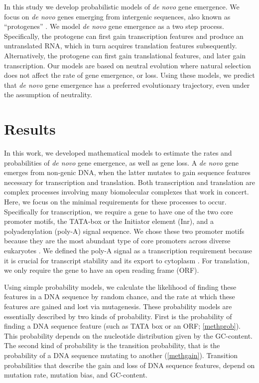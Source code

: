 \documentclass[12pt,a4paper]{article}
\begin{document}
In this study we develop probabilistic models of \textit{de novo} gene emergence. We focus on \textit{de novo} genes emerging from intergenic sequences, also known as ``protogenes'' \citep{protogenes}. We model \textit{de novo} gene emergence as a two step process. Specifically, the protogene can first gain transcription features and produce an untranslated RNA, which in turn acquires translation features subsequently. Alternatively, the protogene can first gain translational features, and later gain transcription. Our models are based on neutral evolution where natural selection does not affect the rate of gene emergence, or loss. Using these models, we predict that \textit{de novo} gene emergence has a preferred evolutionary trajectory, even under the assumption of neutrality.

\section{Results}

In this work, we developed mathematical models to estimate the rates and probabilities of \textit{de novo} gene emergence, as well as gene loss. A \textit{de novo} gene emerges from non-genic DNA, when the latter mutates to gain sequence features necessary for transcription and translation. Both transcription and translation are complex processes involving many biomolecular complexes that work in concert. Here, we focus on the minimal requirements for these processes to occur. Specifically for transcription, we require a gene to have one of the two core promoter motifs, the TATA-box or the Initiator element (Inr), and a polyadenylation (poly-A) signal sequence. We chose these two promoter motifs because they are the most abundant type of core promoters across diverse eukaryotes \citep{Promoters,corepromoters}. We defined the poly-A signal as a transcription requirement because it is crucial for transcript stability and its export to cytoplasm \citep{polyAterm,polyAexp}. For translation, we only require the gene to have an open reading frame (ORF). 

Using simple probability models, we calculate the likelihood of finding these features in a DNA sequence by random chance, and the rate at which these features are gained and lost via mutagenesis. These probability models are essentially described by two kinds of probability. First is the probability of finding a DNA sequence feature (such as TATA box or an ORF; \autoref{methprob}). This probability depends on the nucleotide distribution given by the GC-content. The second kind of probability is the transition probability, that is the probability of a DNA sequence mutating to another (\autoref{methgain}). Transition probabilities that describe the gain and loss of DNA sequence features, depend on mutation rate, mutation bias, and GC-content. 
\end{document}
